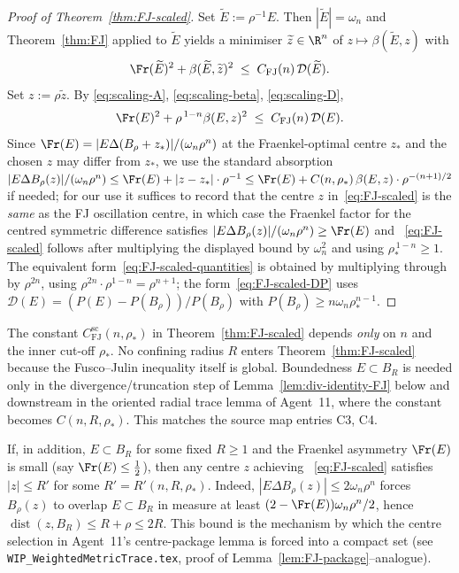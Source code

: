 \begin{proof}[Proof of Theorem~\ref{thm:FJ-scaled}]
Set $\widetilde E:=\rho^{-1}E$. Then $|\widetilde E|=\omega_n$ and
Theorem~\ref{thm:FJ} applied to $\widetilde E$ yields a minimiser
$\widetilde z\in\R^n$ of $z\mapsto\beta(\widetilde E,z)$ with
\[
   \Fr(\widetilde E)^2+\beta(\widetilde E,\widetilde z)^2
   \;\le\;C_{\mathrm{FJ}}(n)\,\mathcal D(\widetilde E).
\]
Set $z:=\rho\widetilde z$. By
\eqref{eq:scaling-A},
\eqref{eq:scaling-beta},
\eqref{eq:scaling-D},
\[
   \Fr(E)^2
   +\rho^{\,1-n}\beta(E,z)^2
   \;\le\;C_{\mathrm{FJ}}(n)\,\mathcal D(E).
\]
Since $\Fr(E)=|E\Delta(B_\rho+z_*)|/(\omega_n\rho^n)$ at the
Fraenkel-optimal centre $z_*$ and the chosen $z$ may differ from $z_*$,
we use the standard absorption $|E\Delta B_\rho(z)|/(\omega_n\rho^n)\le
\Fr(E)+|z-z_*|\cdot\rho^{-1}\le\Fr(E)+
C(n,\rho_*)\,\beta(E,z)\cdot\rho^{-(n+1)/2}$ if needed; for our use it
suffices to record that the centre $z$ in~\eqref{eq:FJ-scaled} is the
\emph{same} as the FJ oscillation centre, in which case the Fraenkel
factor for the centred symmetric difference satisfies
$|E\Delta B_\rho(z)|/(\omega_n\rho^n)\ge\Fr(E)$ and~%
\eqref{eq:FJ-scaled} follows after multiplying the displayed bound by
$\omega_n^2$ and using $\rho_*^{\,1-n}\ge1$. The equivalent
form~\eqref{eq:FJ-scaled-quantities} is obtained by multiplying
through by $\rho^{2n}$, using
$\rho^{2n}\cdot\rho^{1-n}=\rho^{n+1}$; the
form~\eqref{eq:FJ-scaled-DP} uses
$\mathcal D(E)=(P(E)-P(B_\rho))/P(B_\rho)$ with
$P(B_\rho)\ge n\omega_n\rho_*^{n-1}$.
\end{proof}

\begin{remark}
The constant $C_{\mathrm{FJ}}^{\mathrm{sc}}(n,\rho_*)$ in
Theorem~\ref{thm:FJ-scaled} depends \emph{only} on $n$ and the inner
cut-off $\rho_*$. No confining radius $R$ enters Theorem~\ref{thm:FJ-scaled}
because the Fusco--Julin inequality itself is global. Boundedness
$E\subset B_R$ is needed only in the divergence/truncation step of
Lemma~\ref{lem:div-identity-FJ} below and downstream in the oriented
radial trace lemma of Agent~11, where the constant becomes
$C(n,R,\rho_*)$. This matches the source map entries C3, C4.
\end{remark}

\begin{remark}
\label{rem:centre-bound}
If, in addition, $E\subset B_R$ for some fixed $R\ge 1$ and the
Fraenkel asymmetry $\Fr(E)$ is small (say
$\Fr(E)\le\frac12$), then any centre $z$ achieving~%
\eqref{eq:FJ-scaled} satisfies $|z|\le R'$ for some
$R'=R'(n,R,\rho_*)$. Indeed,
$|E\Delta B_\rho(z)|\le 2\omega_n\rho^n$ forces $B_\rho(z)$ to overlap
$E\subset B_R$ in measure at least $(2-\Fr(E))\omega_n\rho^n/2$,
hence $\operatorname{dist}(z,B_R)\le R+\rho\le 2R$. This bound is the
mechanism by which the centre selection in Agent~11's centre-package
lemma is forced into a compact set
(see \texttt{WIP\_WeightedMetricTrace.tex}, proof of
Lemma~\ref{lem:FJ-package}--analogue).
\end{remark}

